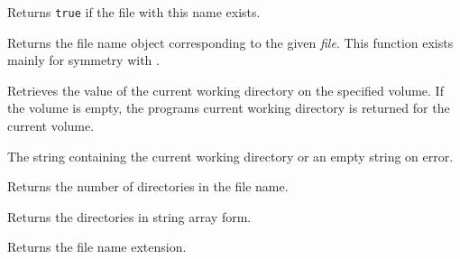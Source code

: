 
Returns {\tt true} if the file with this name exists.





\label{wxfilenamefilename}


Returns the file name object corresponding to the given {\it file}. This
function exists mainly for symmetry with .



\label{wxfilenamegetcwd}


Retrieves the value of the current working directory on the specified volume. If
the volume is empty, the programs current working directory is returned for the
current volume.


The string containing the current working directory or an empty string on
error.




\label{wxfilenamegetdircount}


Returns the number of directories in the file name.


\label{wxfilenamegetdirs}


Returns the directories in string array form.


\label{wxfilenamegetext}


Returns the file name extension.


\label{wxfilenamegetforbiddenchars}


